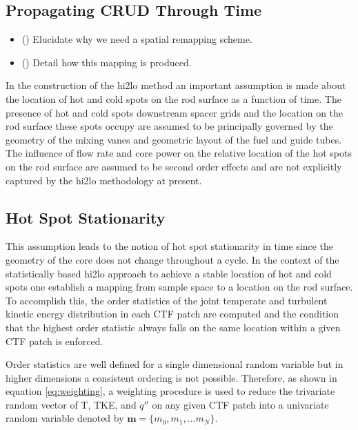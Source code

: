 \subsection{Propagating CRUD Through Time}

\begin{itemize}
        \item (\checkmark) Elucidate why we need a spatial remapping scheme.
        \item (\checkmark) Detail how this mapping is produced.
\end{itemize}

In the construction of the hi2lo method an important assumption is made about the location of hot and cold spots on the rod surface as a function of time.   The presence of hot and cold spots downstream spacer grids and the location on the rod surface these spots occupy are assumed to be principally governed by the geometry of the mixing vanes and geometric layout of the fuel and guide tubes.  The influence of flow rate and core power on the relative location of the hot spots on the rod surface are assumed to be second order effects and are not explicitly captured by the hi2lo methodology at present.

\subsection{Hot Spot Stationarity}

This assumption leads to the notion of hot spot stationarity in time since the geometry of the core does not change throughout a cycle.  In the context of the statistically based hi2lo approach to achieve a stable location of hot and cold spots one establish a mapping from sample space to a location on the rod surface.  To accomplish this, the order statistics of the joint temperate and turbulent kinetic energy distribution in each CTF patch are computed and the condition that the highest order statistic always falls on the same location within a given CTF patch is enforced.

Order statistics are well defined for a single dimensional random variable but in higher dimensions a consistent ordering is not possible.  Therefore, as shown in equation \ref{eq:weighting}, a weighting procedure is used to reduce the trivariate random vector of T, TKE, and $q''$ on any given CTF patch into a univariate random variable denoted by $\mathbf{m}=\{m_0, m_1, ... m_N\}$.

